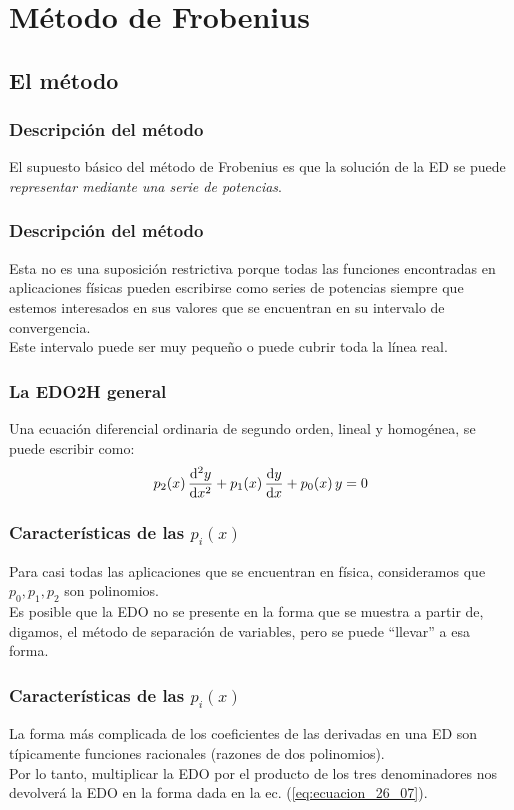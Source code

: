 \documentclass[12pt]{beamer}
\begin{document}
\section{Método de Frobenius}
\subsection{El método}

\begin{frame}
\frametitle{Descripción del método}
El supuesto básico del método de Frobenius es que la solución de la ED se puede \emph{representar mediante una serie de potencias}.
\end{frame}
\begin{frame}
\frametitle{Descripción del método}
Esta no es una suposición restrictiva porque todas las funciones encontradas en aplicaciones físicas pueden escribirse como series de potencias siempre que estemos interesados en sus valores que se encuentran en su intervalo de convergencia.
\\
\bigskip
Este intervalo puede ser muy pequeño o puede cubrir toda la línea real.
\end{frame}
\begin{frame}
\frametitle{La EDO2H general}
Una ecuación diferencial ordinaria de segundo orden, lineal y  homogénea, se puede escribir como:
\begin{align}
p_{2} (x) \, \dv[2]{y}{x} + p_{1} (x) \, \dv{y}{x} + p_{0}(x) \, y = 0
\label{eq:ecuacion_26_07}    
\end{align}
\end{frame}
\begin{frame}
\frametitle{Características de las $p_{i}(x)$}
Para casi todas las aplicaciones que se encuentran en física, consideramos que $p_{0}, p_{1}, p_{2}$ son polinomios.
\\
\bigskip
\pause
Es posible que la EDO no se presente en la forma que se muestra a partir de, digamos, el método de separación de variables, pero se puede \enquote{llevar} a esa forma.
\end{frame}
\begin{frame}
\frametitle{Características de las $p_{i}(x)$}
La forma más complicada de los coeficientes de las derivadas en una ED son típicamente funciones racionales (razones de dos polinomios).
\\
\bigskip
\pause
Por lo tanto, multiplicar la EDO por el producto de los tres denominadores nos devolverá la EDO en la forma dada en la ec. (\ref{eq:ecuacion_26_07}).
\end{frame}
\end{document}
